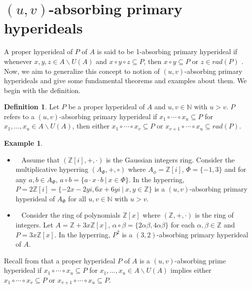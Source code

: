 \documentclass[preprint,review,10pt]{amsart}
\theoremstyle{definition}
\newtheorem{definition}[theorem]{Definition}
\newtheorem{example}[theorem]{Example}
\theoremstyle{remark}
\numberwithin{equation}{section}
\begin{document}
\section{  $(u,v)$-absorbing primary hyperideals }
 A proper hyperideal of $P$ of $A$ is said to be 1-absorbing primary hyperideal if  whenever $x,y,z \in A\backslash U(A)$ and $x \circ y \circ z \subseteq P$, then $x \circ y \subseteq  P$ or  $z \in rad(P)$ \cite{anb1}. Now, we aim to generalize this concept to notion of $(u,v)$-absorbing primary  hyperideals and  give some
fundamental theorems and examples about them. We begin with the deﬁnition.


 
\begin{definition}
Let $P$ be a proper hyperideal of $A$ and $u,v \in \mathbb{N}$ with $u >v$. $P$ refers to  a   $(u,v)$-absorbing primary  hyperideal  if     $x_1 \circ \cdots \circ x_u \subseteq P$ for $x_1,\ldots, x_u \in A \backslash U(A)$, then either $x_1 \circ \cdots \circ x_v \subseteq P$ or $x_{v+1} \circ \cdots \circ x_u \subseteq rad(P)$.
\end{definition}
\begin{example}
\begin{itemize}
\item[\rm{(i)}]~
Assume that $(\mathbb{Z}[i],+,\cdot)$ is the Gaussian integers ring. Consider the multiplicative hyperring $(A_{\Phi},+,\circ)$ where $A_{\phi}=\mathbb{Z}[i]$, $\Phi=\{-1,3\}$ and for any $a,b \in A_{\Phi}$, $a \circ b=\{a \cdot x \cdot b \ \vert \ x \in \Phi\}$. In the hyperring, $P=2\mathbb{Z}[i]=\{-2x-2yi,6x+6yi \ \vert \ x,y \in \mathbb{Z}\}$ is a $(u,v)$-absorbing primary hyperideal of $A_{\Phi}$ for all $u,v \in \mathbb{N}$ with $u >v$.

\item[\rm{(ii)}]~ 
Consider the ring of polynomials $\mathbb{Z}[x]$ where $(\mathbb{Z},+,\cdot)$ is the ring of integers. Let  $A=\mathbb{Z}+3x\mathbb{Z}[x]$, $\alpha \circ \beta=\{2\alpha \beta,4\alpha  \beta\}$ for each $\alpha, \beta\in \mathbb{Z}$ and $P=3x\mathbb{Z}[x]$.  In the hyperring,  $P^2$ is a $(3,2)$-absorbing primary hyperideal of $A$.
\end{itemize}
\end{example}
Recall from \cite{anb8} that a proper hyperideal $P$ of $A$ is  a   $(u,v)$-absorbing prime  hyperideal  if     $x_1 \circ \cdots \circ x_u \subseteq P$ for $x_1,\ldots, x_u \in A \backslash U(A)$ implies either $x_1 \circ \cdots \circ x_v \subseteq P$ or $x_{v+1} \circ \cdots \circ x_u \subseteq P$. 
\end{document}
